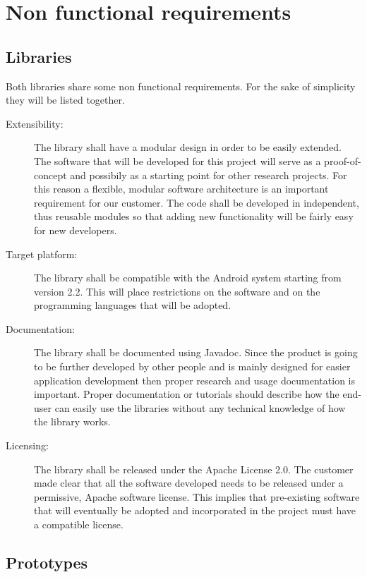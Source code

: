 \newpage

\section{Non functional requirements}

\subsection{Libraries}

Both libraries share some non functional requirements.
For the sake of simplicity they will be listed together.

\begin{description}
	\item[Extensibility:] The library shall have a modular design
	in order to be easily extended. The software that will be developed for
	this project will serve as a proof-of-concept and possibily as a starting point
	for other research projects. For this reason a flexible, modular software
	architecture is an important requirement for our customer. The code shall be
	developed in independent, thus reusable modules so that adding new functionality
	will be fairly easy for new developers.
	\item[Target platform:] The library shall be compatible with the Android
	system starting from version 2.2. This will place restrictions on the software
	and on the programming languages that will be adopted.
	\item[Documentation:] The library shall be documented using Javadoc.
	Since the product is going to be further developed by other people and is
	mainly designed for easier application development then proper research and usage
	documentation is important. Proper documentation or tutorials should describe how
	the end-user can easily use the libraries without any technical knowledge of how
	the library works.
	\item[Licensing:] The library shall be released under the Apache License 2.0.
	The customer made clear that all the software developed needs to be released
	under a permissive, Apache software license. This implies that pre-existing
	software that will eventually be adopted and incorporated in the project must
	have a compatible license.
\end{description}


\subsection{Prototypes}

